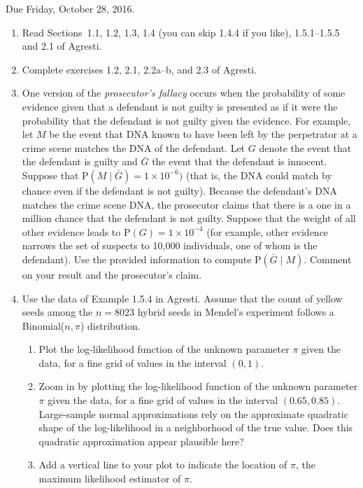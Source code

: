\documentclass[12pt,epsf]{article}
\begin{document}

Due Friday, October 28, 2016.




\begin{enumerate}

\item Read Sections~1.1, 1.2, 1.3, 1.4 (you can skip 1.4.4 if you like), 1.5.1--1.5.5 and 2.1 of Agresti.

\item Complete exercises 1.2, 2.1, 2.2a--b, and 2.3 of Agresti.

\item One version of the {\em prosecutor's fallacy} occurs when the probability of some evidence given that a defendant is not guilty is presented as if it were the probability that the defendant is not guilty given the evidence.  For example, let $M$ be the event that DNA known to have been left by the perpetrator at a crime scene matches the DNA of the defendant. Let $G$ denote the event that the defendant is guilty and $\bar G$ the event that the defendant is innocent.  Suppose that P$(M\mid\bar G)=1\times 10^{-6})$ (that is, the DNA could match by chance even if the defendant is not guilty).  Because the defendant's DNA matches the crime scene DNA, the prosecutor claims that there is a one in a million chance that the defendant is not guilty.  Suppose that the weight of all other evidence leads to P$(G)=1\times 10^{-4}$ (for example, other evidence narrows the set of suspects to 10,000 individuals, one of whom is the defendant).  Use the provided information to compute P$(\bar G\mid M)$.  Comment on your result and the prosecutor's claim.


 \item Use the data of Example 1.5.4 in Agresti.  Assume that the count of yellow seeds among the $n=8023$ hybrid seeds in Mendel's experiment follows a Binomial($n,\pi$) distribution.
     \begin{enumerate}
     \item Plot the log-likelihood function of the unknown parameter $\pi$ given the data, for a fine grid of values in the interval $(0,1)$.
     \item Zoom in by plotting the log-likelihood function of the unknown parameter $\pi$ given the data, for a fine grid of values in the interval $(0.65,0.85)$.  Large-sample normal approximations rely on the approximate quadratic shape of the log-likelihood in a neighborhood of the true value.  Does this quadratic approximation appear plausible here?
     \item Add a vertical line to your plot to indicate the location of $\widehat\pi$, the maximum likelihood estimator of $\pi$.


\end{enumerate}
\end{enumerate}
\end{document}
